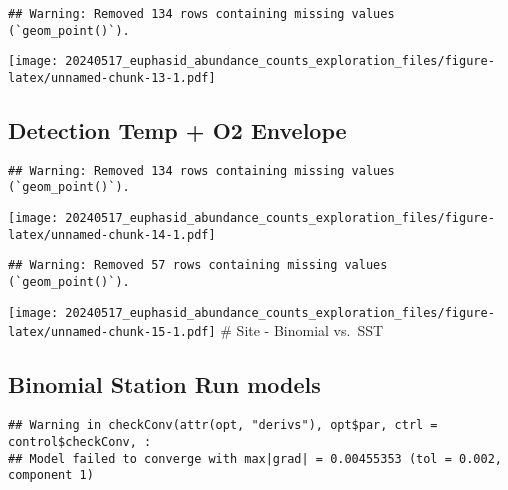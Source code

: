 \documentclass[
]{article}
\begin{document}
\begin{verbatim}
## Warning: Removed 134 rows containing missing values (`geom_point()`).
\end{verbatim}

\texttt{[image: 20240517\_euphasid\_abundance\_counts\_exploration\_files/figure-latex/unnamed-chunk-13-1.pdf]}

\hypertarget{detection-temp-o2-envelope}{%
\subsection{Detection Temp + O2
Envelope}\label{detection-temp-o2-envelope}}

\begin{verbatim}
## Warning: Removed 134 rows containing missing values (`geom_point()`).
\end{verbatim}

\texttt{[image: 20240517\_euphasid\_abundance\_counts\_exploration\_files/figure-latex/unnamed-chunk-14-1.pdf]}

\begin{verbatim}
## Warning: Removed 57 rows containing missing values (`geom_point()`).
\end{verbatim}

\texttt{[image: 20240517\_euphasid\_abundance\_counts\_exploration\_files/figure-latex/unnamed-chunk-15-1.pdf]}
\# Site - Binomial vs.~SST

\hypertarget{binomial-station-run-models}{%
\subsection{Binomial \textbar{} Station Run
models}\label{binomial-station-run-models}}

\begin{verbatim}
## Warning in checkConv(attr(opt, "derivs"), opt$par, ctrl = control$checkConv, :
## Model failed to converge with max|grad| = 0.00455353 (tol = 0.002, component 1)
\end{verbatim}
\end{document}
